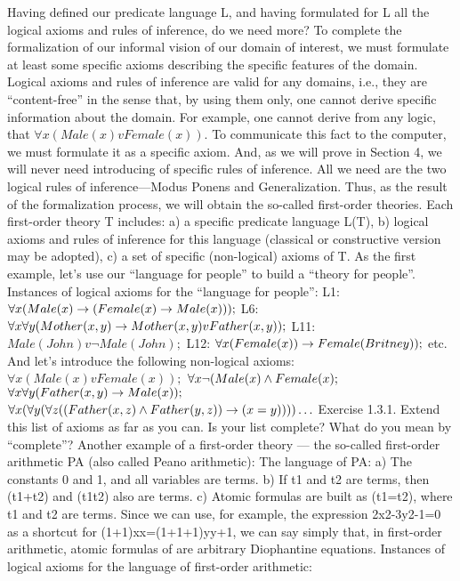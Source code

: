 Having defined our predicate language L, and having formulated for L all the logical axioms and rules of
inference, do we need more?
To complete the formalization of our informal vision of our domain of interest, we must formulate at least
some specific axioms describing the specific features of the domain. Logical axioms and rules of
inference are valid for any domains, i.e., they are ``content-free'' in the sense that, by using them only, one
cannot derive specific information about the domain.
For example, one cannot derive from any logic, that \(\forall x (Male(x) v Female(x))\). To communicate this fact
to the computer, we must formulate it as a specific axiom.
And, as we will prove in Section 4, we will never need introducing of specific rules of inference. All we
need are the two logical rules of inference---Modus Ponens and Generalization.
Thus, as the result of the formalization process, we will obtain the so-called first-order theories.
Each first-order theory T includes:
a) a specific predicate language L(T),
b) logical axioms and rules of inference for this language (classical or constructive version may be
adopted),
c) a set of specific (non-logical) axioms of T.
As the first example, let's use our ``language for people'' to build a ``theory for people''.
Instances of logical axioms for the ``language for people'':
L1: \(\forall x(Male(x)\rightarrow (Female(x)\rightarrow Male(x)));\)
L6: \(\forall x\forall y(Mother(x, y)\rightarrow Mother(x, y) v Father(x, y));\)
L11: \(Male(John) v \neg Male(John);\)
L12: \(\forall x(Female(x))\rightarrow Female(Britney));\)
etc.
And let's introduce the following non-logical axioms:
\(\forall x (Male(x) v Female(x));\)
\(\forall x \neg (Male(x) \wedge  Female(x);\)
\(\forall x\forall y (Father (x, y)\rightarrow Male(x));\)
\(\forall x(\forall y(\forall z((Father(x, z)\wedge Father(y,z))\rightarrow (x=y)))) \ldots \)
Exercise 1.3.1. Extend this list of axioms as far as you can. Is your list complete? What do you mean by ``complete''?
Another example of a first-order theory --- the so-called first-order arithmetic PA (also called Peano arithmetic):
The language of PA:
a) The constants 0 and 1, and all variables are terms.
b) If t1 and t2 are terms, then (t1+t2) and (t1\cdot t2) also are terms.
c) Atomic formulas are built as (t1=t2), where t1 and t2 are terms.
Since we can use, for example, the expression 2x2-3y2-1=0 as a shortcut for (1+1)\cdot x\cdot x=(1+1+1)\cdot y\cdot y+1, we can say simply
that, in first-order arithmetic, atomic formulas of are arbitrary Diophantine equations.
Instances of logical axioms for the language of first-order arithmetic:
